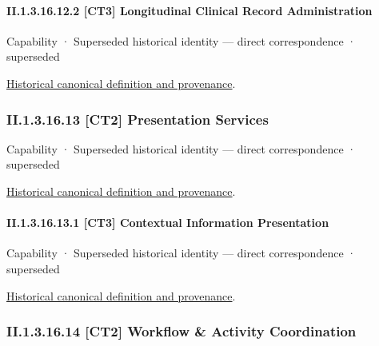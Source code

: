\paragraph*{II.1.3.16.12.2 [CT3] Longitudinal Clinical Record Administration}
\label{navigation:II.1.3.16.12.2}

\label{element:bd91d848cf424c42bec7c80cd32edd28}
{\small Capability · Superseded historical identity — direct correspondence · superseded}\par
\href{../../../../continuum/strategy/capability/bd91d848cf424c42bec7c80cd32edd28.md}{Historical canonical definition and provenance}.\par
\subsubsection*{II.1.3.16.13 [CT2] Presentation Services}
\label{navigation:II.1.3.16.13}

\label{element:c89e7c8b277247d9965fdb534aad2d1f}
{\small Capability · Superseded historical identity — direct correspondence · superseded}\par
\href{../../../../continuum/strategy/capability/c89e7c8b277247d9965fdb534aad2d1f.md}{Historical canonical definition and provenance}.\par
\paragraph*{II.1.3.16.13.1 [CT3] Contextual Information Presentation}
\label{navigation:II.1.3.16.13.1}

\label{element:e349d5f6a8774bbe8d150f9c51af770c}
{\small Capability · Superseded historical identity — direct correspondence · superseded}\par
\href{../../../../continuum/strategy/capability/e349d5f6a8774bbe8d150f9c51af770c.md}{Historical canonical definition and provenance}.\par
\subsubsection*{II.1.3.16.14 [CT2] Workflow \& Activity Coordination}
\label{navigation:II.1.3.16.14}

